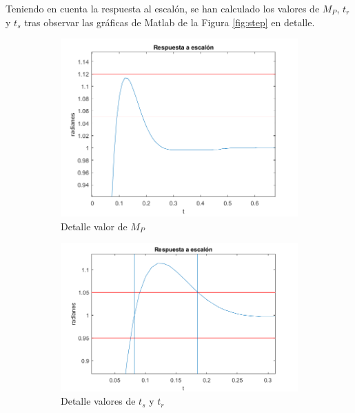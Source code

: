 \documentclass[a4paper]{article}
\begin{document}
Teniendo en cuenta la respuesta al escalón, se han calculado los valores de $M_P$, $t_r$ y $t_s$ tras observar las gráficas de Matlab de la Figura \ref{fig:step} en detalle. 

\begin{center}
	\begin{figure}[htp]
		\begin{subfigure}{1\textwidth}
			\centering
			\includegraphics[width=12cm]{escalon_Mp2}
			\caption{Detalle valor de $M_P$}
			\label{fig:mp2}
		\end{subfigure}
		
		\begin{subfigure}{1\textwidth}
			\centering
			\includegraphics[width=12cm]{escalon_ts_tr2}
			\caption{Detalle valores de $t_s$ y $t_r$}
			\label{fig:tr}
		\end{subfigure}
		\caption{}
		\label{fig:escalon}
	\end{figure}
\end{center}
\end{document}
